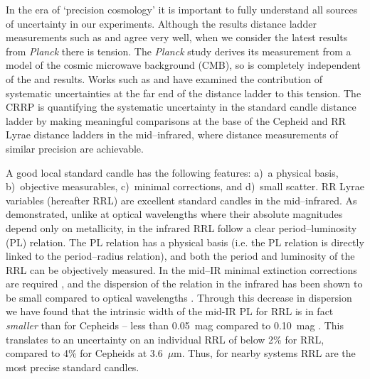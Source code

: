 \documentclass[a4paper,fleqn,usenatbib]{mnras}
\begin{document}
In the era of `precision cosmology' it is important to fully understand all sources of uncertainty in our experiments. Although the results distance ladder measurements such as \citet{2011ApJ...730..119R} and \citet{2012ApJ...758...24F} agree very well, 
when we consider the latest results from {\it Planck} 
 there is tension. The {\it Planck} study derives its measurement from a model of the cosmic microwave background (CMB), so is completely independent of the \citeauthor{2011ApJ...730..119R} and \citeauthor{2012ApJ...758...24F} results. Works such as \citet{2015ApJ...802...20R} and \citet{2014MNRAS.440.1138E} have examined the contribution of systematic uncertainties at the far end of the distance ladder to this tension. The CRRP is quantifying the systematic uncertainty in the standard candle distance ladder by making meaningful comparisons at the base of the Cepheid and RR Lyrae distance ladders in the mid--infrared, where distance measurements of similar precision are achievable. 

A good local standard candle \citep[as defined by][]{1986ApJ...303....1A} has the following  features: a)~a physical basis, b)~objective measurables, c)~minimal corrections, and d)~small scatter. RR Lyrae variables (hereafter RRL) are excellent standard candles in the mid--infrared. As \citet{1986MNRAS.220..279L} demonstrated, unlike at optical wavelengths where their absolute magnitudes depend only on metallicity, in the infrared RRL follow a clear period--luminosity (PL) relation. The PL relation has a physical basis (i.e. the PL relation is directly linked to the period--radius relation), and both the period and luminosity of the RRL can be objectively measured. In the mid--IR minimal extinction corrections are required \citep[$A_{[3.6]} \approx A_{V}/16$,][]{2005ApJ...619..931I}, and the dispersion of the relation in the infrared has been shown to be small compared to optical wavelengths \citep{2015ApJ...808...50M, 2004ApJS..154..633C}. Through this decrease in dispersion we have found that the intrinsic width of the mid-IR PL for RRL is in fact \emph{smaller} than for Cepheids -- less than 0.05~mag compared to 0.10~mag \citep{2015ApJ...808...11N, 2011ApJ...743...76S}. This translates to an uncertainty on an individual RRL of below 2\% for RRL, compared to 4\% for Cepheids at 3.6~$\mu$m. Thus, for nearby systems RRL are the most precise standard candles.
\end{document}
